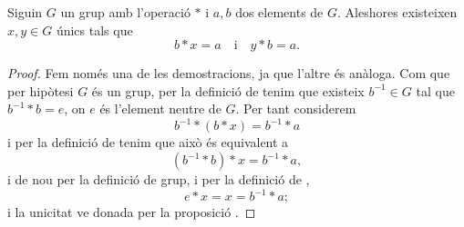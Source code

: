 \documentclass[../../Main.tex]{subfiles}
\begin{document}
	\begin{lemma}
		\label{lema:solucions úniques en grups a equacions}
		Siguin \(G\) un grup amb l'operació \(\ast\) i \(a,b\) dos elements de \(G\). Aleshores existeixen \(x,y\in G\) únics tals que
		\[b\ast x=a\quad\text{i}\quad y\ast b=a.\]
		\begin{proof}
			Fem només una de les demostracions, ja que l'altre és anàloga. Com que per hipòtesi \(G\) és un grup, per la definició de  tenim que existeix \(b^{-1}\in G\) tal que \(b^{-1}\ast b=e\), on \(e\) és l'element neutre de \(G\). Per tant considerem
			\[b^{-1}\ast(b\ast x)=b^{-1}\ast a\]
			i per la definició de  tenim que això és equivalent a
			\[(b^{-1}\ast b)\ast x=b^{-1}\ast a,\]
			i de nou per la definició de grup, i per la definició de ,
			\[e\ast x=x=b^{-1}\ast a ;\]
			i la unicitat ve donada per la proposició .
		\end{proof}
	\end{lemma}
\end{document}
